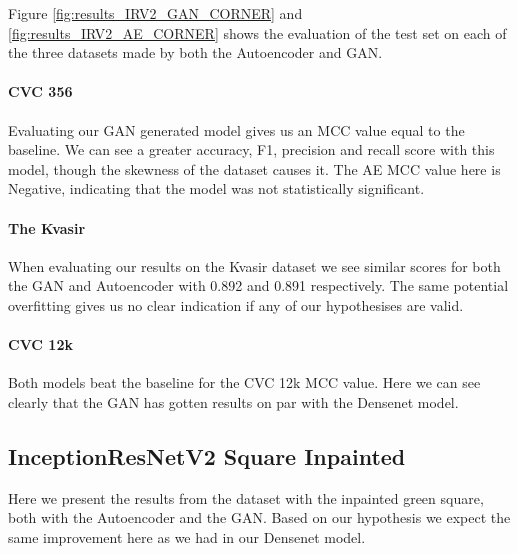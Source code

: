 %
\noindent Figure \ref{fig:results_IRV2_GAN_CORNER} and \ref{fig:results_IRV2_AE_CORNER} shows the evaluation of the test set on each of the three datasets made by both the Autoencoder and GAN. 

\paragraph{CVC 356}
Evaluating our GAN generated model gives us an MCC value equal to the baseline. We can see a greater accuracy, F1, precision and recall score with this model, though the skewness of the dataset causes it. 
The AE MCC value here is Negative, indicating that the model was not statistically significant. 

\paragraph{The Kvasir}
When evaluating our results on the Kvasir dataset we see similar scores for both the GAN and Autoencoder with 0.892 and 0.891 respectively.  The same potential overfitting gives us no clear indication if any of our hypothesises are valid.

\paragraph{CVC 12k}
Both models beat the baseline for the CVC 12k MCC value. Here we can see clearly that the GAN has gotten results on par with the Densenet model.















\subsection{InceptionResNetV2 Square Inpainted}

Here we present the results from the dataset with the inpainted green square, both with the Autoencoder and the GAN.  
Based on our hypothesis we expect the same improvement here as we had in our Densenet model.  
 

